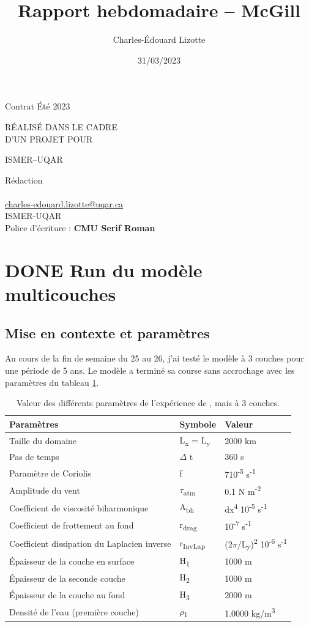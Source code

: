 \documentclass[10pt]{article}
\author{Charles-Édouard Lizotte}
\date{31/03/2023}
\title{Rapport hebdomadaire -- McGill}
\makeatletter
\numberwithin{equation}{section}
\newcommand{\mytitlepage}{
\begin{titlepage}
\begin{center}
{\Huge \thesubtitle \par}
\vspace{2cm}
{\Huge \MakeUppercase{\thetitle} \par}
\vspace{2cm}
RÉALISÉ DANS LE CADRE\\ D'UN PROJET POUR \par
\vspace{2cm}
{\Huge ISMER--UQAR \par}
\vspace{2cm}
{\thedate}
\end{center}
\vfill
Rédaction \\
{\theauthor}\\
\url{charles-edouard.lizotte@uqar.ca}\\
ISMER-UQAR\\
Police d'écriture : \textbf{CMU Serif Roman}
\end{titlepage}
}
\newcommand{\thesubtitle}{Contrat Été 2023}
\makeatother
\begin{document}
\mytitlepage
\tableofcontents\newpage

\section{{\bfseries\sffamily DONE} Run du modèle multicouches}
\label{sec:orgcef19a3}
\subsection{Mise en contexte et paramètres}
\label{sec:orgee519b6}
Au cours de la fin de semaine du 25 au 26, j'ai testé le modèle à 3 couches pour une période de 5 ans.
Le modèle a terminé sa course sans accrochage avec les paramètres du tableau \ref{tab:org044ed9b}.

\begin{table}[htbp]
\caption{\label{tab:org044ed9b}Valeur des différents paramètres de l'expérience de , mais à 3 couches.}
\centering
\begin{tabular}{lll}
\hline
\hline
Paramètres & Symbole & Valeur\\[0pt]
\hline
Taille du domaine & L\textsubscript{x} = L\textsubscript{y} & 2000 km\\[0pt]
Pas de temps & \(\Delta\) t & 360 s\\[0pt]
Paramètre de Coriolis & f & 7\texttimes{}10\textsuperscript{-5} s\textsuperscript{-1}\\[0pt]
Amplitude du vent & \(\tau\)\textsubscript{atm} & 0.1 N m\textsuperscript{-2}\\[0pt]
Coefficient de viscosité biharmonique & A\textsubscript{bh} & dx\textsuperscript{4} \texttimes{}10\textsuperscript{-5} s\textsuperscript{-1}\\[0pt]
Coefficient de frottement au fond & r\textsubscript{drag} & 10\textsuperscript{-7} s\textsuperscript{-1}\\[0pt]
Coefficient dissipation du Laplacien inverse & r\textsubscript{InvLap} & (2\(\pi\)/L\textsubscript{y})\textsuperscript{2} \texttimes{} 10\textsuperscript{-6} s\textsuperscript{-1}\\[0pt]
Épaisseur de la couche en surface & H\textsubscript{1} & 1000 m\\[0pt]
Épaisseur de la seconde couche & H\textsubscript{2} & 1000 m\\[0pt]
Épaisseur de la couche au fond & H\textsubscript{3} & 2000 m\\[0pt]
Densité de l'eau (première couche) & \(\rho\)\textsubscript{1} & 1.0000 kg/m\textsuperscript{3}\\[0pt]

\end{tabular}
\end{table}
\end{document}
